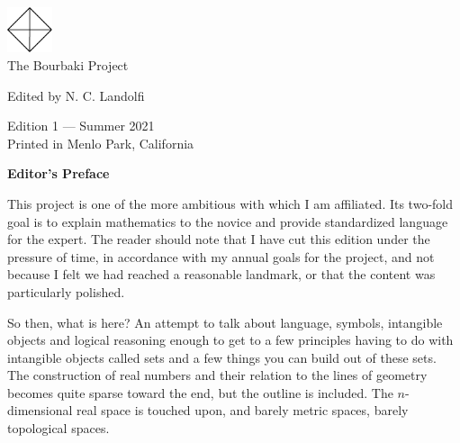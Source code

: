 




\usepackage{tocloft}
\setlength{\cftsecnumwidth}{3em}



\begin{center}
  \includegraphics[width=0.1\textwidth]{../trademark}
  \\
  \vspace{0.5cm}
  \textsf{\Large The Bourbaki Project}

{\small \textsf{Edited by N. C. Landolfi}}
\end{center}

\vspace{\fill}

\begin{center}
  {\small \textsf{Edition 1 --- Summer 2021}} \\

  {\footnotesize \textsf{Printed in Menlo Park, California}}
\end{center}

\thispagestyle{empty}

\clearpage

\begin{center}
\textbf{Editor's Preface}
\end{center}

This project is one of the more ambitious with which I am affiliated.
Its two-fold goal is to explain mathematics to the novice and provide standardized language for the expert.
The reader should note that I have cut this edition under the pressure of time, in accordance with my annual goals for the project, and not because I felt we had reached a reasonable landmark, or that the content was particularly polished.

So then, what is here?
An attempt to talk about language, symbols, intangible objects and logical reasoning enough to get to a few principles having to do with intangible objects called sets and a few things you can build out of these sets.
The construction of real numbers and their relation to the lines of geometry becomes quite sparse toward the end, but the outline is included.
The $n$-dimensional real space is touched upon, and barely metric spaces, barely topological spaces.

